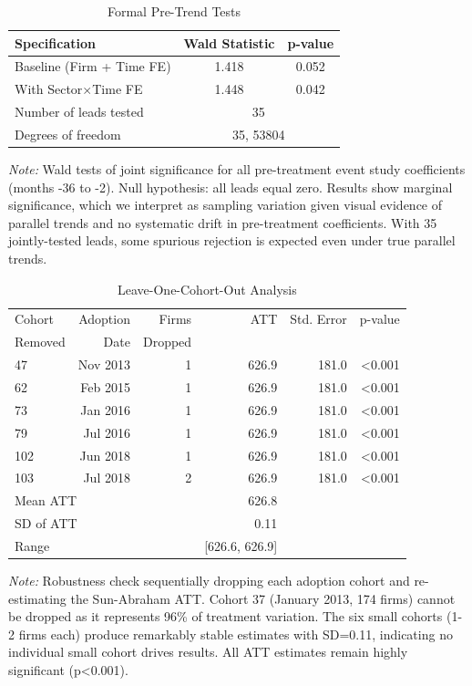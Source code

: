 \documentclass{article}
\begin{document}
\begin{table}[H]
\centering
\caption{Formal Pre-Trend Tests}
\label{tab:pretrend}
\begin{tabular}{lcc}
\toprule
Specification & Wald Statistic & p-value \\
\midrule
Baseline (Firm + Time FE) & 1.418 & 0.052 \\
With Sector$\times$Time FE & 1.448 & 0.042 \\
\midrule
Number of leads tested & \multicolumn{2}{c}{35} \\
Degrees of freedom & \multicolumn{2}{c}{35, 53804} \\
\bottomrule
\end{tabular}
\begin{tablenotes}[flushleft]
\small
\item \textit{Note:} Wald tests of joint significance for all pre-treatment event study coefficients (months -36 to -2). Null hypothesis: all leads equal zero. Results show marginal significance, which we interpret as sampling variation given visual evidence of parallel trends and no systematic drift in pre-treatment coefficients. With 35 jointly-tested leads, some spurious rejection is expected even under true parallel trends.
\end{tablenotes}
\end{table}

\begin{table}[H]
\centering
\caption{Leave-One-Cohort-Out Analysis}
\label{tab:loco}
\begin{tabular}{lrrrrr}
\toprule
Cohort & Adoption & Firms & ATT & Std. Error & p-value \\
Removed & Date & Dropped & & & \\
\midrule
47 & Nov 2013 & 1 & 626.9 & 181.0 & <0.001 \\
62 & Feb 2015 & 1 & 626.9 & 181.0 & <0.001 \\
73 & Jan 2016 & 1 & 626.9 & 181.0 & <0.001 \\
79 & Jul 2016 & 1 & 626.9 & 181.0 & <0.001 \\
102 & Jun 2018 & 1 & 626.9 & 181.0 & <0.001 \\
103 & Jul 2018 & 2 & 626.9 & 181.0 & <0.001 \\
\midrule
\multicolumn{2}{l}{Mean ATT} & & 626.8 & & \\
\multicolumn{2}{l}{SD of ATT} & & 0.11 & & \\
\multicolumn{2}{l}{Range} & & [626.6, 626.9] & & \\
\bottomrule
\end{tabular}
\begin{tablenotes}[flushleft]
\small
\item \textit{Note:} Robustness check sequentially dropping each adoption cohort and re-estimating the Sun-Abraham ATT. Cohort 37 (January 2013, 174 firms) cannot be dropped as it represents 96\% of treatment variation. The six small cohorts (1-2 firms each) produce remarkably stable estimates with SD=0.11, indicating no individual small cohort drives results. All ATT estimates remain highly significant (p<0.001).
\end{tablenotes}
\end{table}
\end{document}
